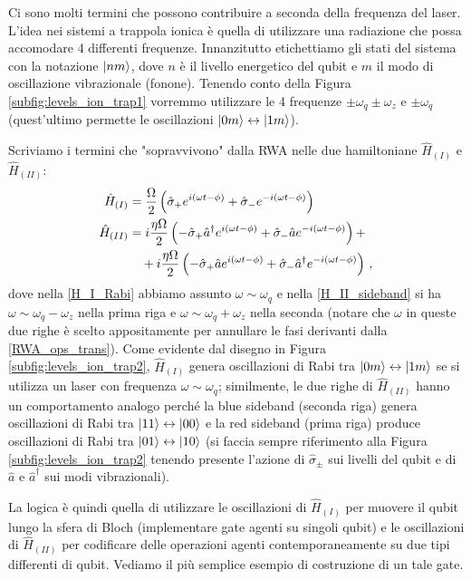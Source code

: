 \noindent Ci sono molti termini che possono contribuire a seconda della frequenza del laser. L'idea nei sistemi a trappola ionica è quella di utilizzare una radiazione che possa accomodare 4 differenti frequenze. Innanzitutto etichettiamo gli stati del sistema con la notazione $\ket{nm}$, dove $n$ è il livello energetico del qubit e $m$ il modo di oscillazione vibrazionale (fonone). Tenendo conto della Figura \ref{subfig:levels_ion_trap1} vorremmo utilizzare le 4 frequenze $\pm \omega_q \pm \omega_z$ e $\pm \omega_q$ (quest'ultimo permette le oscillazioni $\ket{0m} \leftrightarrow \ket{1m}$).

\noindent Scriviamo i termini che "sopravvivono" dalla RWA nelle due hamiltoniane $\hat{H}_{(I)}$ e $\hat{H}_{(II)}$:
\begin{align}
    \hat{H}_{(I)} &= \frac{\Omega}{2} \left( \hat{\sigma}_+ e^{i(\omega t - \phi)} + \hat{\sigma}_- e^{-i(\omega t - \phi)} \right) \label{H_I_Rabi} \\
    \hat{H}_{(II)} &= i \frac{\eta \Omega}{2} \left( -\hat{\sigma}_+ \hat{a}^\dag e^{i(\omega t - \phi)} + \hat{\sigma}_- \hat{a} e^{-i(\omega t - \phi)} \right) + \label{H_II_sideband} \\
    &\quad + i \frac{\eta \Omega}{2} \left( -\hat{\sigma}_+ \hat{a} e^{i(\omega t - \phi)} + \hat{\sigma}_- \hat{a}^\dag e^{-i(\omega t - \phi)} \right) \, , \notag
\end{align}
dove nella \eqref{H_I_Rabi} abbiamo assunto $\omega \sim \omega_q$ e nella \eqref{H_II_sideband} si ha $\omega \sim \omega_q - \omega_z$ nella prima riga e $\omega \sim \omega_q + \omega_z$ nella seconda (notare che $\omega$ in queste due righe è scelto appositamente per annullare le fasi derivanti dalla \eqref{RWA_ops_trans}). Come evidente dal disegno in Figura \ref{subfig:levels_ion_trap2}, $\hat{H}_{(I)}$ genera oscillazioni di Rabi tra $\ket{0 m} \leftrightarrow \ket{1m}$ se si utilizza un laser con frequenza $\omega \sim \omega_q$; similmente, le due righe di $\hat{H}_{(II)}$ hanno un comportamento analogo perché la blue sideband (seconda riga) genera oscillazioni di Rabi tra $\ket{11} \leftrightarrow \ket{00}$ e la red sideband (prima riga) produce oscillazioni di Rabi tra $\ket{01} \leftrightarrow \ket{10}$ (si faccia sempre riferimento alla Figura \ref{subfig:levels_ion_trap2} tenendo presente l'azione di $\hat{\sigma}_\pm$ sui livelli del qubit e di $\hat{a}$ e $\hat{a}^\dag$ sui modi vibrazionali).  

\noindent La logica è quindi quella di utilizzare le oscillazioni di $\hat{H}_{(I)}$ per muovere il qubit lungo la sfera di Bloch (implementare gate agenti su singoli qubit) e le oscillazioni di $\hat{H}_{(II)}$ per codificare delle operazioni agenti contemporaneamente su due tipi differenti di qubit. Vediamo il più semplice esempio di costruzione di un tale gate.

